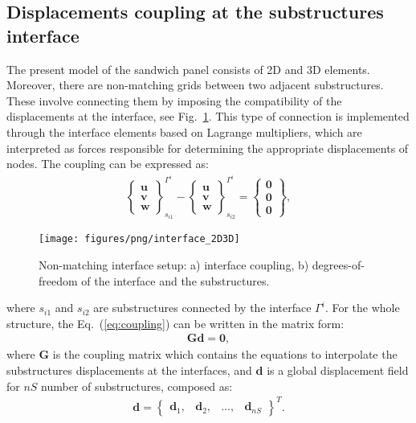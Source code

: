 \documentclass[sensors,article,submit,moreauthors,pdftex]{Definitions/mdpi}
\begin{document}
\subsection{Displacements coupling at the substructures interface}
\label{sec:interface}
The present model of the sandwich panel consists of 2D and 3D elements. 
Moreover, there are non-matching grids between two adjacent substructures. 
These involve connecting them by imposing the compatibility of the displacements at the interface, see Fig.~\ref{fig:interface}.
This type of connection is implemented through the interface elements based on Lagrange multipliers, which are interpreted as forces responsible for determining the appropriate displacements of nodes.
The coupling can be expressed as:
\begin{eqnarray}
\left\{\begin{array}{c}
\textbf{u}\\
\textbf{v}\\
\textbf{w}
\end{array}\right\}_{s_{i1}}^{\Gamma^i}-
\left\{\begin{array}{c}
\textbf{u}\\
\textbf{v}\\
\textbf{w}
\end{array}\right\}_{s_{i2}}^{\Gamma^i}=
\left\{\begin{array}{c}
\textbf{0}\\
\textbf{0}\\
\textbf{0}
\end{array}\right\},
\label{eq:coupling}
\end{eqnarray}
\begin{figure}
	\begin{center}
		\texttt{[image: figures/png/interface\_2D3D]}
	\end{center}
	\caption{Non-matching interface setup: a) interface coupling, b) degrees-of-freedom of the interface and the substructures.}
	\label{fig:interface}
\end{figure}
where \(s_{i1}\) and \(s_{i2}\) are substructures connected by the interface \(\Gamma^i\). For the whole structure, the Eq.~(\ref{eq:coupling}) can be written in the matrix form:
\begin{eqnarray}
\textbf{G}\textbf{d}=\textbf{0},
\label{eq:cond_disp}
\end{eqnarray}
where \textbf{G} is the coupling matrix which contains the equations to interpolate the substructures displacements at the interfaces, and \(\textbf{d}\) is a global displacement field for \(nS\) number of substructures, composed as:
\begin{eqnarray}
\textbf{d} = \left\{\begin{array}{cccc}
\textbf{d}_1, & \textbf{d}_2, &\ldots, & \textbf{d}_{nS}
\end{array}\right\}^T.
\label{eq:displacements}
\end{eqnarray}
\end{document}
